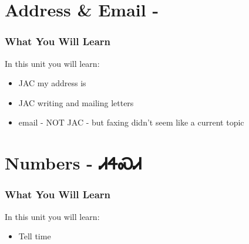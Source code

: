 \chapter*{Address \& Email - }
\subsection{What You Will Learn}
In this unit you will learn:
\begin{itemize}
\item JAC my address is
\item JAC writing and mailing letters
\item email - NOT JAC - but faxing didn't seem like a current topic
\end{itemize}\newpage

\newpage{}
\chapter*{Numbers - ᏗᏎᏍᏗ}
\subsection{What You Will Learn}
In this unit you will learn:
\begin{itemize}
\item Tell time
\end{itemize}\newpage

